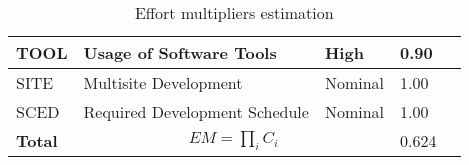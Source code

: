 \begin{table}[!htbp]
\begin{tabular}{| l | l | l | l | l |}
        \hline
        TOOL            & Usage of Software Tools                   & High              & 0.90              \\
        \hline
        SITE            & Multisite Development                     & Nominal                 & 1.00              \\
        \hline
        SCED            & Required Development Schedule             & Nominal                 & 1.00              \\
        \hline
        \textbf{Total}  & \multicolumn{2}{|c|}{$EM=\prod_i C_i$}                              & 0.624             \\
        \hline
    \end{tabular}
    \caption{Effort multipliers estimation}
    \label{tab:cost-drivers}
\end{table}